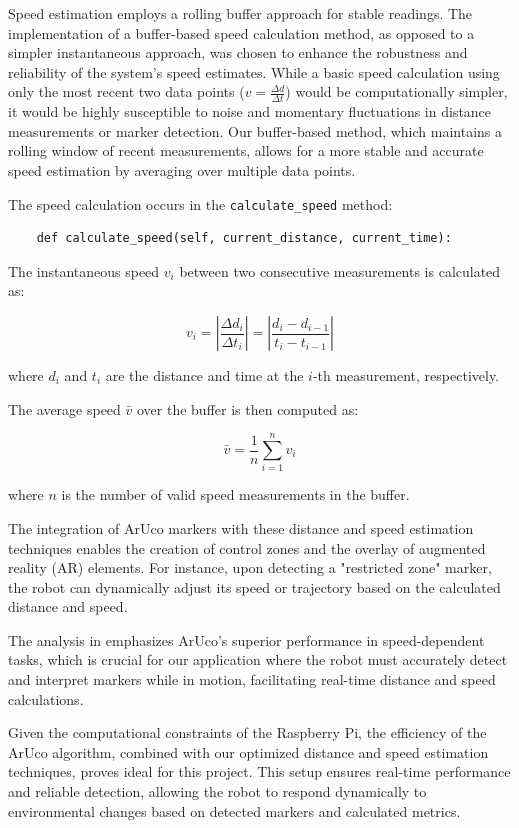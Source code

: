 Speed estimation employs a rolling buffer approach for stable readings. The implementation of a buffer-based speed calculation method, as opposed to a simpler instantaneous approach, was chosen to enhance the robustness and reliability of the system's speed estimates. While a basic speed calculation using only the most recent two data points ($v = \frac{\Delta d}{\Delta t}$) would be computationally simpler, it would be highly susceptible to noise and momentary fluctuations in distance measurements or marker detection. Our buffer-based method, which maintains a rolling window of recent measurements, allows for a more stable and accurate speed estimation by averaging over multiple data points. 

The speed calculation occurs in the \texttt{calculate\_speed} method:

\begin{verbatim}
	def calculate_speed(self, current_distance, current_time):
\end{verbatim}

The instantaneous speed \(v_i\) between two consecutive measurements is calculated as:

\[
v_i = \left|\frac{\Delta d_i}{\Delta t_i}\right| = \left|\frac{d_i - d_{i-1}}{t_i - t_{i-1}}\right|
\]

where \(d_i\) and \(t_i\) are the distance and time at the \(i\)-th measurement, respectively.

The average speed \(\bar{v}\) over the buffer is then computed as:

\[
\bar{v} = \frac{1}{n} \sum_{i=1}^{n} v_i
\]

where \(n\) is the number of valid speed measurements in the buffer.


The integration of ArUco markers with these distance and speed estimation techniques enables the creation of control zones and the overlay of augmented reality (AR) elements. For instance, upon detecting a "restricted zone" marker, the robot can dynamically adjust its speed or trajectory based on the calculated distance and speed.

The analysis in \cite{patru2023empirical} emphasizes ArUco's superior performance in speed-dependent tasks, which is crucial for our application where the robot must accurately detect and interpret markers while in motion, facilitating real-time distance and speed calculations.

Given the computational constraints of the Raspberry Pi, the efficiency of the ArUco algorithm, combined with our optimized distance and speed estimation techniques, proves ideal for this project. This setup ensures real-time performance and reliable detection, allowing the robot to respond dynamically to environmental changes based on detected markers and calculated metrics.


